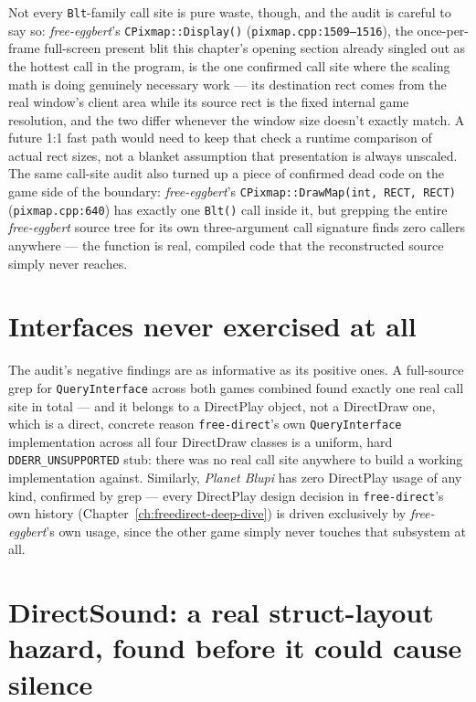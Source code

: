 Not every \texttt{Blt}-family call site is pure waste, though, and the audit is careful to
say so: \emph{free-eggbert}'s \texttt{CPixmap::Display()} (\texttt{pixmap.cpp:1509--1516}),
the once-per-frame full-screen present blit this chapter's opening section already singled
out as the hottest call in the program, is the one confirmed call site where the scaling
math is doing genuinely necessary work --- its destination rect comes from the real window's
client area while its source rect is the fixed internal game resolution, and the two differ
whenever the window size doesn't exactly match. A future 1:1 fast path would need to keep
that check a runtime comparison of actual rect sizes, not a blanket assumption that
presentation is always unscaled. The same call-site audit also turned up a piece of
confirmed dead code on the game side of the boundary: \emph{free-eggbert}'s
\texttt{CPixmap::DrawMap(int, RECT, RECT)} (\texttt{pixmap.cpp:640}) has exactly one
\texttt{Blt()} call inside it, but grepping the entire \emph{free-eggbert} source tree for
its own three-argument call signature finds zero callers anywhere --- the function is real,
compiled code that the reconstructed source simply never reaches.

\section{Interfaces never exercised at all}

The audit's negative findings are as informative as its positive ones. A full-source grep for
\texttt{QueryInterface} across both games combined found exactly one real call site in
total --- and it belongs to a DirectPlay object, not a DirectDraw one, which is a direct,
concrete reason \texttt{free-direct}'s own \texttt{QueryInterface} implementation across all
four DirectDraw classes is a uniform, hard \texttt{DDERR\_UNSUPPORTED} stub: there was no real
call site anywhere to build a working implementation against. Similarly, \emph{Planet Blupi}
has zero DirectPlay usage of any kind, confirmed by grep --- every DirectPlay design decision
in \texttt{free-direct}'s own history (Chapter~\ref{ch:freedirect-deep-dive}) is driven
exclusively by \emph{free-eggbert}'s own usage, since the other game simply never touches
that subsystem at all.

\section{DirectSound: a real struct-layout hazard, found before it could cause silence}

